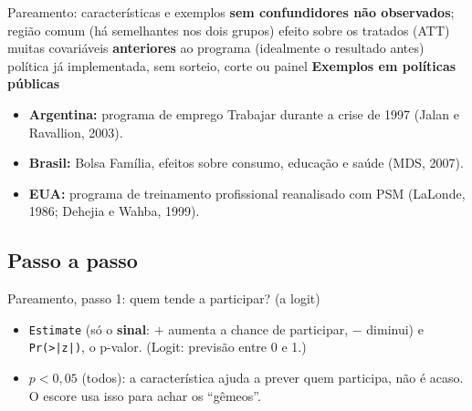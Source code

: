 \begin{frame}{Pareamento: características e exemplos}
        {\textbf{sem confundidores não observados}; região comum (há semelhantes nos dois grupos)}
        {efeito sobre os tratados (ATT)}
        {muitas covariáveis \textbf{anteriores} ao programa (idealmente o resultado antes)}
        {política já implementada, sem sorteio, corte ou painel}
  \vspace{0.05cm}
  \textbf{\footnotesize\color{azul}Exemplos em políticas públicas}\par
    \scriptsize
    \begin{itemize}
      \item \textbf{Argentina:} programa de emprego Trabajar durante a crise de 1997 (Jalan e Ravallion, 2003).
      \item \textbf{Brasil:} Bolsa Família, efeitos sobre consumo, educação e saúde (MDS, 2007).
      \item \textbf{EUA:} programa de treinamento profissional reanalisado com PSM (LaLonde, 1986; Dehejia e Wahba, 1999).
    \end{itemize}
\end{frame}

\subsection{Passo a passo}

\begin{frame}[fragile]{Pareamento, passo 1: quem tende a participar? (a logit)}
\begin{leitura}
  \begin{itemize}\setlength{\itemsep}{1pt}
    \item {} \texttt{Estimate} (só o \textbf{sinal}: $+$ aumenta a chance de participar, $-$ diminui) e \texttt{Pr(>|z|)}, o p-valor. (Logit: previsão entre 0 e 1.)
    \item {} $p<0{,}05$ (todos): a característica ajuda a prever quem participa, não é acaso. O escore usa isso para achar os ``gêmeos''.
  \end{itemize}
\end{leitura}
\end{frame}

